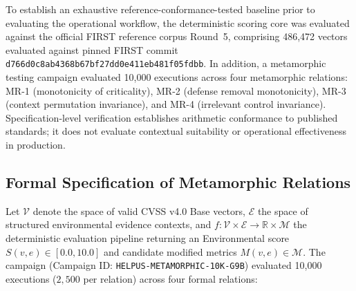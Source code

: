 \documentclass[conference]{IEEEtran}
\begin{document}
To establish an exhaustive reference-conformance-tested baseline prior to evaluating the operational
workflow, the deterministic scoring core was evaluated against the official FIRST reference
corpus Round~5, comprising 486,472 vectors evaluated against pinned FIRST commit
\texttt{d766d0c8ab4368b67bf27dd0e411eb481f05fdbb}. In addition, a metamorphic testing
campaign evaluated 10,000 executions across four metamorphic relations: MR-1 (monotonicity of
criticality), MR-2 (defense removal monotonicity), MR-3 (context permutation invariance),
and MR-4 (irrelevant control invariance). Specification-level verification establishes
arithmetic conformance to published standards; it does not evaluate contextual suitability or
operational effectiveness in production.

\subsection{Formal Specification of Metamorphic Relations}

Let $\mathcal{V}$ denote the space of valid CVSS v4.0 Base vectors, $\mathcal{E}$ the space of structured environmental evidence contexts, and $f: \mathcal{V} \times \mathcal{E} \to \mathbb{R} \times \mathcal{M}$ the deterministic evaluation pipeline returning an Environmental score $S(v, e) \in [0.0, 10.0]$ and candidate modified metrics $M(v, e) \in \mathcal{M}$. The campaign (Campaign ID: \texttt{HELPUS-METAMORPHIC-10K-G9B}) evaluated 10,000 executions ($2,500$ per relation) across four formal relations:
\end{document}
